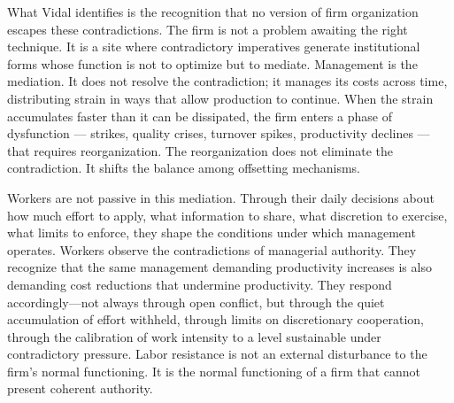 What Vidal identifies is the recognition that no version of firm organization escapes these contradictions. The firm is not a problem awaiting the right technique. It is a site where contradictory imperatives generate institutional forms whose function is not to optimize but to mediate. Management is the mediation. It does not resolve the contradiction; it manages its costs across time, distributing strain in ways that allow production to continue. When the strain accumulates faster than it can be dissipated, the firm enters a phase of dysfunction — strikes, quality crises, turnover spikes, productivity declines — that requires reorganization. The reorganization does not eliminate the contradiction. It shifts the balance among offsetting mechanisms.

Workers are not passive in this mediation. Through their daily decisions about how much effort to apply, what information to share, what discretion to exercise, what limits to enforce, they shape the conditions under which management operates. Workers observe the contradictions of managerial authority. They recognize that the same management demanding productivity increases is also demanding cost reductions that undermine productivity. They respond accordingly—not always through open conflict, but through the quiet accumulation of effort withheld, through limits on discretionary cooperation, through the calibration of work intensity to a level sustainable under contradictory pressure. Labor resistance is not an external disturbance to the firm's normal functioning. It is the normal functioning of a firm that cannot present coherent authority.

